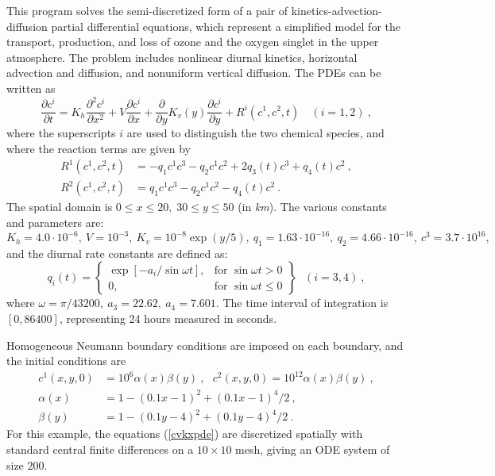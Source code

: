 This program solves the semi-discretized form of a pair of
kinetics-advection-diffusion partial differential equations, which
represent a simplified model for the transport, production, and loss
of ozone and the oxygen singlet in the upper atmosphere.  The problem
includes nonlinear diurnal kinetics, horizontal advection and diffusion, 
and nonuniform vertical diffusion.  The PDEs can be written as
\begin{equation}\label{cvkxpde}
  \frac{\partial c^i}{\partial t}=K_h\frac{\partial^2 c^i}{\partial x^2}
  +V \frac{\partial c^i}{\partial x}
  + \frac{\partial} {\partial y} K_v(y) \frac{\partial c^i}{\partial y}
  + R^i(c^1,c^2,t) \quad (i=1,2)~,
\end{equation}
where the superscripts $i$ are used to distinguish the two chemical
species, and where the reaction terms are given by
\begin{equation}\label{e:cvkx:r}
\begin{split}
  R^1(c^1,c^2,t) & = -q_1c^1c^3-q_2c^1c^2+2q_3(t)c^3+q_4(t)c^2 ~, \\
  R^2(c^1,c^2,t) & = q_1c^1c^3-q_2c^1c^2-q_4(t)c^2 ~.
\end{split}
\end{equation}
The spatial domain is $0 \leq x \leq 20,\;30 \leq y \leq 50$ (in {\it km}). 
The various constants and parameters are: $K_h=4.0\cdot 10^{-6},
~ V=10^{-3},~ K_v=10^{-8}\exp (y/5),~ q_1=1.63\cdot 10^{-16},
~ q_2=4.66\cdot 10^{-16},~ c^3=3.7\cdot 10^{16},$ and the diurnal
rate constants are defined as:
\begin{equation*}
q_i(t) = 
\left\{ \begin{array}{ll}
  \exp [-a_i/\sin \omega t], & \mbox{for } \sin \omega t>0 \\
  0, & \mbox{for } \sin \omega t\leq 0
  \end{array} \right\} ~~~(i=3,4) ~,
\end{equation*}
where $\omega =\pi /43200, ~ a_3=22.62,~ a_4=7.601.$  The time interval of
integration is $[0, 86400]$, representing 24 hours measured in seconds.

Homogeneous Neumann boundary conditions are imposed on each boundary, and the
initial conditions are 
\begin{equation} \label{cvkxic}
  \begin{split}
  c^{1}(x,y,0) &= 10^{6}\alpha (x)\beta (y) ~,~~~ 
                    c^{2}(x,y,0)=10^{12}\alpha(x)\beta (y) ~, \\
  \alpha (x) &= 1-(0.1x-1)^{2}+(0.1x-1)^{4}/2 ~, \\
  \beta (y) &= 1-(0.1y-4)^{2}+(0.1y-4)^{4}/2 ~.
  \end{split} 
\end{equation}
For this example, the equations (\ref{cvkxpde}) are discretized spatially
with standard central finite differences on a $10 \times 10$ mesh,
giving an ODE system of size $200$.

